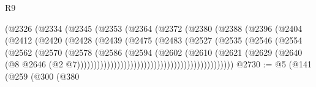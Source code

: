 \begin{lexlean}{R9}
\begin{coremodule}
                                  (@2326
                                    (@2334
                                      (@2345
                                        (@2353
                                          (@2364
                                            (@2372
                                              (@2380
                                                (@2388
                                                  (@2396
                                                    (@2404
                                                      (@2412
                                                        (@2420
                                                          (@2428
                                                            (@2439
                                                              (@2475
                                                                (@2483
                                                                  (@2527
                                                                    (@2535
                                                                      (@2546
                                                                        (@2554
                                                                          (@2562
                                                                            (@2570
                                                                              (@2578
                                                                                (@2586
                                                                                  (@2594
                                                                                    (@2602
                                                                                      (@2610
                                                                                        (@2621
                                                                                          (@2629
                                                                                            (@2640
                                                                                              (@8
                                                                                                @2646
                                                                                                (@2
                                                                                                  @7)))))))))))))))))))))))))))))))))))))))))))))))
@2730 := @5
    (@141
      (@259
        (@300
          (@380

\end{coremodule}
\end{lexlean}
